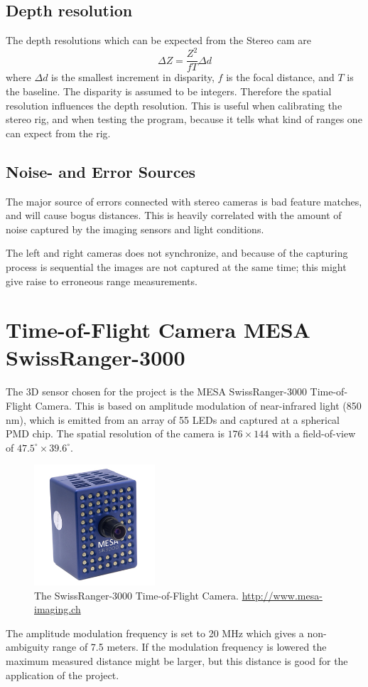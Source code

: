 \subsection{Depth resolution}
The depth resolutions which can be expected from the Stereo cam are
\begin{equation}
    \Delta Z = \frac{Z^2}{f T}\Delta d
\end{equation}
where $\Delta d$ is the smallest increment in disparity, $f$ is the focal distance, and
$T$ is the baseline. The disparity is assumed to be integers. Therefore the spatial
resolution influences the depth resolution. 
This is useful when calibrating the stereo rig, and when testing the program,
because it tells what kind of ranges one can expect from the rig.


\subsection{Noise- and Error Sources}
The major source of errors connected with stereo cameras is bad feature matches, and 
will cause bogus distances. This is heavily correlated with the amount of noise captured
by the imaging sensors and light conditions. 

The left and right cameras does not synchronize, and because of the
capturing process is sequential the images are not captured at the same time; this might
give raise to erroneous range measurements. 




\section{Time-of-Flight Camera MESA SwissRanger-3000}
The 3D sensor chosen for the project is the MESA SwissRanger-3000 Time-of-Flight Camera.
This is based on amplitude modulation of near-infrared light (850 nm), which is emitted from an
array of 55 LEDs and captured at a spherical PMD chip. The spatial resolution of the camera
is $176\times144$ with a field-of-view of $47.5^\circ \times 39.6^\circ$. 
\begin{figure}[htbp]
    \centering
    \includegraphics[width=0.4\textwidth]{pics/sr3000}
    \caption[The SwissRanger-3000 Time-of-Flight Camera.]{The SwissRanger-3000 Time-of-Flight 
    Camera. \url{http://www.mesa-imaging.ch}}
    \label{chap3:fig-sr3000}
\end{figure}
The amplitude modulation frequency is set to 20 MHz which gives a non-ambiguity range of
7.5 meters. If the modulation frequency is lowered the maximum measured distance might be
larger, but this distance is good for the application of the project. 

